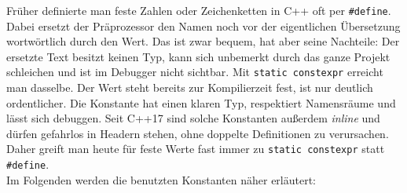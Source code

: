 \documentclass[a4paper,12pt]{article}
\begin{document}
Früher definierte man feste Zahlen oder Zeichenketten in C++ oft per \verb|#define|. Dabei ersetzt der Präprozessor den Namen noch vor der eigentlichen Übersetzung wortwörtlich durch den Wert. Das ist zwar bequem, hat aber seine Nachteile: Der ersetzte Text besitzt keinen Typ, kann sich unbemerkt durch das ganze Projekt schleichen und ist im Debugger nicht sichtbar. Mit \verb|static constexpr| erreicht man dasselbe. Der Wert steht bereits zur Kompilierzeit fest, ist nur deutlich ordentlicher. Die Konstante hat einen klaren Typ, respektiert Namensräume und lässt sich debuggen. Seit C++17 sind solche Konstanten außerdem \emph{inline} und dürfen gefahrlos in Headern stehen, ohne doppelte Definitionen zu verursachen. Daher greift man heute für feste Werte fast immer zu \verb|static constexpr| statt \verb|#define|.
\\[1em]
Im Folgenden werden die benutzten Konstanten näher erläutert:
\end{document}

